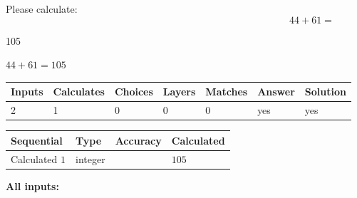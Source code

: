 \documentclass[12pt]{article}
\begin{document}
Please calculate:
\begin{equation}
44 +  %
61 = \nonumber
\end{equation}
 
 
 
\noindent{}
 
 

105
 
 
\noindent{}
 
 

 
 
 
\noindent{}
 
 

$ %
44 +  %
61=   %
105$
 
 
\noindent{}
 
 

 
   
   
   
   
\noindent\begin{tabular}{|l|l|l|l|l|l|l|}
 \hline
Inputs & Calculates & Choices & Layers & Matches & Answer & Solution \\ \hline
 2  & 
 1  & 
 0
  & 
 0  & 
 0  & 
  yes & 
  yes 
  \\ \hline
 \end{tabular}
   
   
   
   
\noindent{}
   
   
  
  
\noindent\begin{tabular}{|l|l|l|l|}
\hline
 Sequential & Type & Accuracy & Calculated \\ 
\hline
 
 
  Calculated $  1 $ & integer &  & 
  $ 105 $ 
 \\  \hline  
 \end{tabular}
   
   
   
   
\noindent\vspace{0.1in}\hspace{-0.08in} {\textbf{\Large{All inputs: }}}
   
   
  
\end{document}
